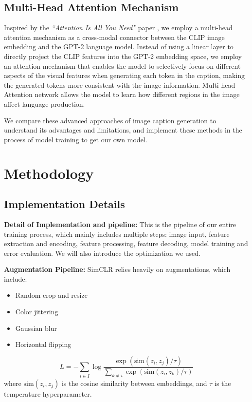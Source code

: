 \documentclass[11pt]{article}
\begin{document}
    \subsection{Multi-Head Attention Mechanism}
    Inspired by the \textit{``Attention Is All You Need''} paper 
    \cite{vaswani2017attention}, we employ a multi-head attention 
    mechanism as a cross-modal connector between the CLIP image embedding
    and the GPT-2 language model. Instead of using a linear layer to directly 
    project the CLIP features into the GPT-2 embedding space, we employ an 
    attention mechanism that enables the model to selectively focus on 
    different aspects of the visual features when generating each token 
    in the caption, making the generated tokens more consistent with the 
    image information. Multi-head Attention network allows the model to 
    learn how different regions in the image affect language production.

We compare these advanced approaches of image caption generation to understand its 
advantages and limitations, and implement these methods in the process of model training to get our own model.
\pagebreak
\section{Methodology}

\subsection{Implementation Details}
\textbf{Detail of Implementation and pipeline:} This is the pipeline of 
our entire training process, which mainly includes multiple steps: 
image input, feature extraction and encoding, feature processing, 
feature decoding, model training and error evaluation. We will also 
introduce the optimization we used.


\textbf{Augmentation Pipeline:} SimCLR relies heavily on augmentations, which include:
\begin{itemize}
  \item Random crop and resize
  \item Color jittering
  \item Gaussian blur
  \item Horizontal flipping
\end{itemize}
\begin{equation}
    L = -\sum_{i \in I} \log \frac{\exp(\text{sim}(z_i, z_j)/\tau)}{\sum_{k \neq i}\exp(\text{sim}(z_i, z_k)/\tau)}
    \end{equation}
    where $\text{sim}(z_i, z_j)$ is the cosine similarity between embeddings, and $\tau$ is the temperature hyperparameter.
    
\end{document}
